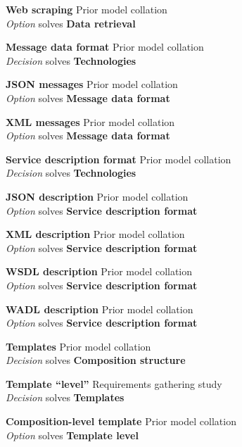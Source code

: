 \textbf{Web scraping} \hfill Prior model collation \cite{Minhas2012} \\ \emph{Option} \hfill solves \textbf{Data retrieval}

\textbf{Message data format} \hfill Prior model collation \cite{Pietschmann2010} \\ \emph{Decision} \hfill solves \textbf{Technologies}

\textbf{JSON messages} \hfill Prior model collation \cite{Pietschmann2010} \\ \emph{Option} \hfill solves \textbf{Message data format}

\textbf{XML messages} \hfill Prior model collation \cite{Pietschmann2010} \\ \emph{Option} \hfill solves \textbf{Message data format}

\textbf{Service description format} \hfill Prior model collation \cite{Pietschmann2010} \\ \emph{Decision} \hfill solves \textbf{Technologies}

\textbf{JSON description} \hfill Prior model collation \cite{Pietschmann2010} \\ \emph{Option} \hfill solves \textbf{Service description format}

\textbf{XML description} \hfill Prior model collation \cite{Pietschmann2010} \\ \emph{Option} \hfill solves \textbf{Service description format}

\textbf{WSDL description} \hfill Prior model collation \cite{Pietschmann2010} \\ \emph{Option} \hfill solves \textbf{Service description format}

\textbf{WADL description} \hfill Prior model collation \cite{Pietschmann2010} \\ \emph{Option} \hfill solves \textbf{Service description format}

\textbf{Templates} \hfill Prior model collation \cite{Pietschmann2010} \\ \emph{Decision} \hfill solves \textbf{Composition structure}

\textbf{Template ``level''} \hfill Requirements gathering study \\ \emph{Decision} \hfill solves \textbf{Templates}

\textbf{Composition-level template} \hfill Prior model collation \cite{Pietschmann2010} \\ \emph{Option} \hfill solves \textbf{Template level}

